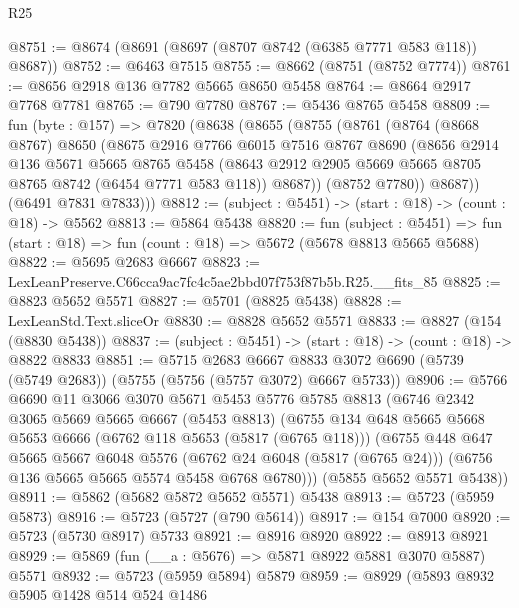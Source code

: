 \begin{lexlean}{R25}
\begin{coremodule}
@8751 := @8674 (@8691 (@8697 (@8707 @8742 (@6385 @7771 @583 @118)) @8687))
@8752 := @6463 @7515
@8755 := @8662 (@8751 (@8752 @7774))
@8761 := @8656 @2918 @136 @7782 @5665 @8650 @5458
@8764 := @8664 @2917 @7768 @7781
@8765 := @790 @7780
@8767 := @5436 @8765 @5458
@8809 := fun (byte : @157) =>
  @7820
    (@8638
      (@8655
        (@8755
          (@8761
            (@8764
              (@8668 @8767)
              @8650
              (@8675
                @2916
                @7766
                @6015
                @7516
                @8767
                @8690
                (@8656
                  @2914
                  @136
                  @5671
                  @5665
                  @8765
                  @5458
                  (@8643 @2912 @2905 @5669 @5665 @8705 @8765 @8742 (@6454 @7771 @583 @118))
                  @8687))
              (@8752 @7780))
            @8687))
        (@6491 @7831 @7833)))
@8812 := (subject : @5451) -> (start : @18) -> (count : @18) -> @5562
@8813 := @5864 @5438
@8820 := fun (subject : @5451) =>
  fun (start : @18) => fun (count : @18) => @5672 (@5678 @8813 @5665 @5688)
@8822 := @5695 @2683 @6667
@8823 := LexLeanPreserve.C66cca9ac7fc4c5ae2bbd07f753f87b5b.R25.__fits_85
@8825 := @8823 @5652 @5571
@8827 := @5701 (@8825 @5438)
@8828 := LexLeanStd.Text.sliceOr
@8830 := @8828 @5652 @5571
@8833 := @8827 (@154 (@8830 @5438))
@8837 := (subject : @5451) -> (start : @18) -> (count : @18) -> @8822 @8833
@8851 := @5715
    @2683
    @6667
    @8833
    @3072
    @6690
    (@5739 (@5749 @2683))
    (@5755 (@5756 (@5757 @3072) @6667 @5733))
@8906 := @5766
    @6690
    @11
    @3066
    @3070
    @5671
    @5453
    @5776
    @5785
    @8813
    (@6746
      @2342
      @3065
      @5669
      @5665
      @6667
      (@5453 @8813)
      (@6755
        @134
        @648
        @5665
        @5668
        @5653
        @6666
        (@6762 @118 @5653 (@5817 (@6765 @118)))
        (@6755
          @448
          @647
          @5665
          @5667
          @6048
          @5576
          (@6762 @24 @6048 (@5817 (@6765 @24)))
          (@6756 @136 @5665 @5665 @5574 @5458 @6768 @6780)))
      (@5855 @5652 @5571 @5438))
@8911 := @5862 (@5682 @5872 @5652 @5571) @5438
@8913 := @5723 (@5959 @5873)
@8916 := @5723 (@5727 (@790 @5614))
@8917 := @154 @7000
@8920 := @5723 (@5730 @8917) @5733
@8921 := @8916 @8920
@8922 := @8913 @8921
@8929 := @5869 (fun (__a : @5676) => @5871 @8922 @5881 @3070 @5887) @5571
@8932 := @5723 (@5959 @5894) @5879
@8959 := @8929
    (@5893
      @8932
      @5905
      @1428
      @514
      @524
      @1486

\end{coremodule}
\end{lexlean}
